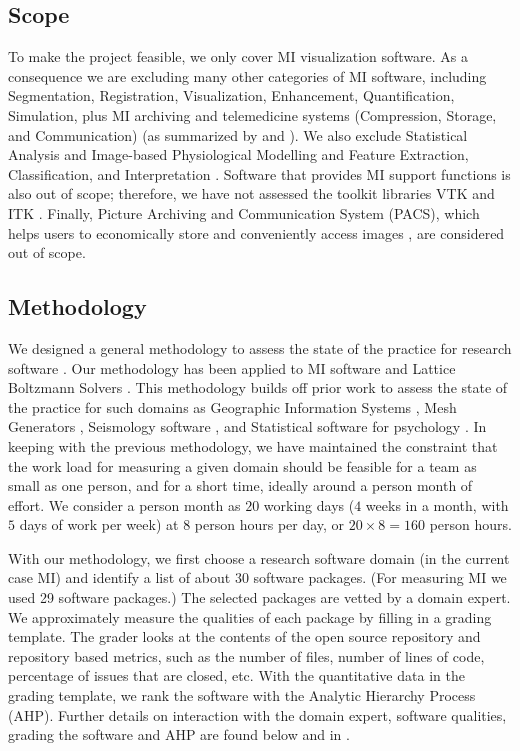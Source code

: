 \documentclass[11pt]{article}
\begin{document}
\subsection{Scope} \label{sec_scope}

To make the project feasible, we only cover MI visualization software.  As a
consequence we are excluding many other categories of MI software, including
Segmentation, Registration, Visualization, Enhancement, Quantification,
Simulation, plus MI archiving and telemedicine systems (Compression, Storage,
and Communication) (as summarized by \citet{Bankman2000} and
\citet{Angenent2006}).  We also exclude Statistical Analysis and Image-based
Physiological Modelling \citep{enwiki:1034877594} and Feature Extraction,
Classification, and Interpretation \citep{Kim2011}. Software that provides MI
support functions is also out of scope; therefore, we have not assessed the
toolkit libraries VTK \citep{SchroederEtAl2006} and ITK \citep{McCormick2014}.
Finally, Picture Archiving and Communication System (PACS), which helps users to
economically store and conveniently access images \citep{Choplin1992}, are
considered out of scope. 

\subsection{Methodology}

We designed a general methodology to assess the state of the practice for
research software \citep{SmithEtAl2021, SmithAndMichalski2022}.  Our methodology
has been applied to MI software \citep{Dong2021} and Lattice Boltzmann Solvers
\citep{Michalski2021, SmithEtAl2024}.  This methodology builds off prior work to
assess the state of the practice for such domains as Geographic Information
Systems \citep{smith2018state}, Mesh Generators \citep{smith2016state},
Seismology software \citep{Smith2018Seismology}, and Statistical software for
psychology \citep{smith2018statistical}.  In keeping with the previous
methodology, we have maintained the constraint that the work load for measuring
a given domain should be feasible for a team as small as one person, and for a
short time, ideally around a person month of effort. We consider a person month
as $20$ working days ($4$ weeks in a month, with $5$ days of work per week) at
$8$ person hours per day, or $20 \times 8 = 160$ person hours.

With our methodology, we first choose a research software domain (in the current
case MI) and identify a list of about 30 software packages. (For measuring MI we
used 29 software packages.)  The selected packages are vetted by a domain
expert. We approximately measure the qualities of each package by filling in a
grading template. The grader looks at the contents of the open source repository
and repository based metrics, such as the number of files, number of lines of
code, percentage of issues that are closed, etc.  With the quantitative data in
the grading template, we rank the software with the Analytic Hierarchy Process
(AHP). Further details on interaction with the domain expert, software
qualities, grading the software and AHP are found below and in
\citep{SmithEtAl2024_MI_SOP}.
\end{document}
